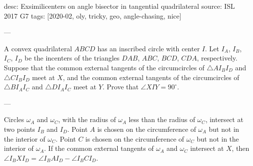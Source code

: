 desc: Exsimilicenters on angle bisector in tangential quadrilateral
source: ISL 2017 G7
tags: [2020-02, oly, tricky, geo, angle-chasing, nice]

---

A convex quadrilateral $ABCD$ has an inscribed circle with center $I$. Let $I_A$, $I_B$, $I_C$, $I_D$ be the incenters of the triangles $DAB$, $ABC$, $BCD$, $CDA$, respectively. Suppose that the common external tangents of the circumcircles of $\triangle AI_BI_D$ and $\triangle CI_BI_D$ meet at $X$, and the common external tangents of the circumcircles of $\triangle BI_AI_C$ and $\triangle DI_AI_C$ meet at $Y$. Prove that $\angle XIY=90^\circ$.

---

\begin{lemma*}
    Circles $\omega_A$ and $\omega_C$, with the radius of $\omega_A$ less than the radius of $\omega_C$, intersect at two points $I_B$ and $I_D$. Point $A$ is chosen on the circumference of $\omega_A$ but not in the interior of $\omega_C$. Point $C$ is chosen on the circumference of $\omega_C$ but not in the interior of $\omega_A$. If the common external tangents of $\omega_A$ and $\omega_C$ intersect at $X$, then $\angle I_BXI_D=\angle I_BAI_D-\angle I_BCI_D$.
\end{lemma*}
